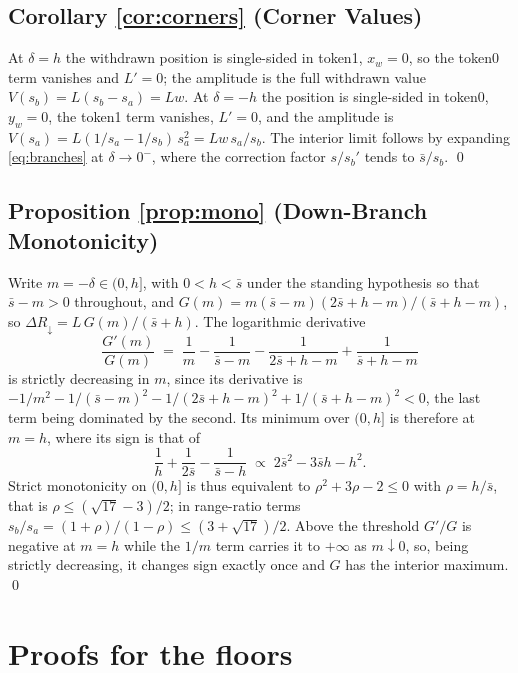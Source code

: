 \documentclass[11pt,a4paper]{article}
\theoremstyle{definition}
\theoremstyle{plain}
\theoremstyle{remark}
\begin{document}
\subsection{Corollary \ref{cor:corners} (Corner Values)}

At $\delta = h$ the withdrawn position is single-sided in token1, $x_w = 0$, so the token0 term vanishes and $L' = 0$; the amplitude is the full withdrawn value $V(s_b) = L(s_b - s_a) = Lw$. At
$\delta = -h$ the position is single-sided in token0, $y_w = 0$, the token1 term vanishes, $L' = 0$, and the amplitude is $V(s_a) = L(1/s_a - 1/s_b)\, s_a^2 = L w\, s_a / s_b$. The interior
limit follows by expanding \eqref{eq:branches} at $\delta \to 0^-$, where the correction factor $s/s_b'$ tends to $\bar s / s_b$. \qed

\subsection{Proposition \ref{prop:mono} (Down-Branch Monotonicity)}

Write $m = -\delta \in (0, h]$, with $0 < h < \bar s$ under the standing hypothesis so that $\bar s - m > 0$ throughout, and $G(m) = m(\bar s - m)(2\bar s + h - m)/(\bar s + h - m)$, so 
$\Delta R_{\downarrow} = L\, G(m)/(\bar s + h)$. The logarithmic derivative
\[
\frac{G'(m)}{G(m)} \;=\; \frac1m - \frac{1}{\bar s - m} -
\frac{1}{2\bar s + h - m} + \frac{1}{\bar s + h - m}
\]
is strictly decreasing in $m$, since its derivative is $-1/m^2 - 1/(\bar s - m)^2 - 1/(2\bar s + h - m)^2 + 1/(\bar s + h - m)^2 < 0$, the last term being dominated by the second. Its minimum over $(0,h]$
is therefore at $m = h$, where its sign is that of
\[
\frac1h + \frac{1}{2\bar s} - \frac{1}{\bar s - h}
\;\propto\; 2\bar s^2 - 3\bar s h - h^2 .
\]
Strict monotonicity on $(0,h]$ is thus equivalent to $\rho^2 + 3\rho - 2 \le 0$ with $\rho = h/\bar s$, that is $\rho \le (\sqrt{17}-3)/2$;
in range-ratio terms $s_b/s_a = (1+\rho)/(1-\rho) \le
(3+\sqrt{17})/2$. Above the threshold $G'/G$ is negative at $m = h$ while the $1/m$ term carries it to $+\infty$ as $m \downarrow 0$, so, being strictly decreasing, it changes sign 
exactly once and $G$ has the interior maximum. \qed

\section{Proofs for the floors}\label{app:floors}
\end{document}

